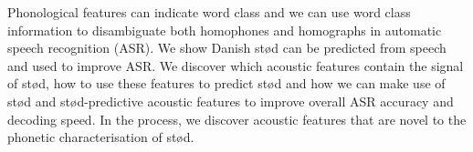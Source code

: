 Phonological features can indicate word class and we can use word class information to disambiguate both homophones and homographs in automatic speech recognition (ASR). We show Danish stød can be predicted from speech and used to improve ASR. We discover which acoustic features contain the signal of stød, how to use these features to predict stød and how we can make use of stød and stød-predictive acoustic features to improve overall ASR accuracy and decoding speed. In the process, we discover acoustic features that are novel to the phonetic characterisation of stød.
